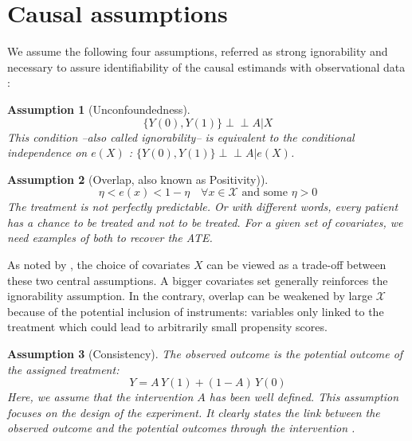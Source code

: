 \documentclass[10pt]{article}
\newcommand{\indep}{\perp \!\!\! \perp}
\newtheorem{assumption}{Assumption}
\begin{document}
\section{Causal assumptions}\label{apd:causal_assumptions}

We assume the following four assumptions, referred as strong ignorability and
necessary to assure identifiability of the causal estimands with observational
data \cite{rubin_causal_2005}:
\begin{assumption}[Unconfoundedness]\label{assumption:ignorability}
    \begin{equation*}\label{eq:ignorability}
        \{Y(0), Y(1) \} \indep A | X
    \end{equation*}
    This condition --also called ignorability-- is equivalent to the conditional
    independence on $e(X)$ \cite{rosenbaum_central_1983}: $\{Y(0), Y(1) \}
        \indep  A | e(X)$.
\end{assumption}


\begin{assumption}[Overlap, also known as Positivity)]\label{assumption:overlap}
    \begin{equation*}\label{eq:overlap}
        \eta < e(x) < 1 - \eta \quad \forall x \in \mathcal X \text{ and some } \eta > 0
    \end{equation*}
    The treatment is not perfectly predictable. Or with different words, every
    patient has a chance to be treated and not to be treated. For a given set of
    covariates, we need examples of both to recover the ATE.
\end{assumption}

As noted by \cite{damour_overlap_2020}, the choice of covariates $X$ can
be viewed as a trade-off between these two central assumptions. A bigger
covariates set generally reinforces the ignorability assumption. In the
contrary, overlap can be weakened by large $\mathcal{X}$ because of the
potential inclusion of instruments: variables only linked to the treatment which
could lead to arbitrarily small propensity scores.


\begin{assumption}[Consistency]\label{assumption:consistency} The observed
    outcome is the potential outcome of the assigned treatment:
    \begin{equation*}\label{eq:consistancy}
        Y = A \, Y(1) + (1-A) \, Y(0)
    \end{equation*}
    Here, we assume that the intervention $A$ has been well defined. This
    assumption focuses on the design of the experiment. It clearly states the link
    between the observed outcome and the potential outcomes through the
    intervention \cite{hernan_causal_2020}.
\end{assumption}
\end{document}
